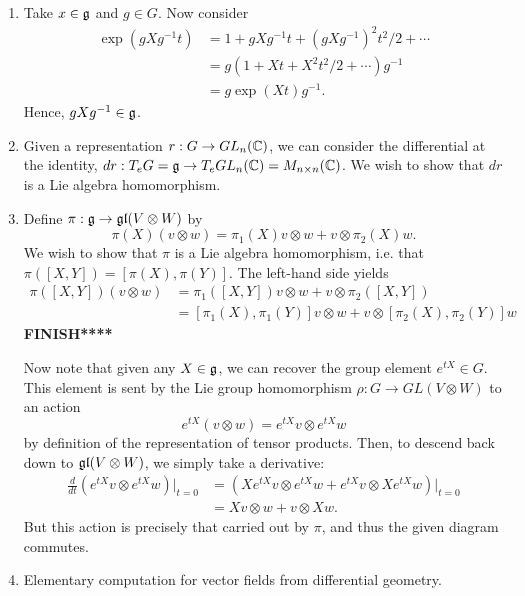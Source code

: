 \documentclass{../mathnotes}
\begin{document}
\begin{enumerate}

    \item Take $x\in\mathfrak g$ and $g\in G$. Now consider
        \begin{align*}
            \exp\left(gXg^{-1}t\right)&=1+gXg^{-1}t+(gXg^{-1})^2t^2/2+\cdots\\
            &=g\left(1+Xt+X^2t^2/2+\cdots\right)g^{-1}\\
            &=g\exp(Xt)g^{-1}.
        \end{align*}
        Hence, $gXg^{-1}\in\mathfrak g$.

    \item Given a representation $r:G\to GL_n(\mathbb{C})$, we can consider the differential at the identity,
        $dr:T_eG=\mathfrak g\to T_eGL_n(\mathbb{C})=M_{n\times n}(\mathbb{C})$. We wish to show that $dr$ is a Lie algebra homomorphism.

    \item Define $\pi:\mathfrak g\to\mathfrak{gl}(V\otimes W)$ by
        \[\pi(X)(v\otimes w)=\pi_1(X)v\otimes w+v\otimes \pi_2(X)w.\]
        We wish to show that $\pi$ is a Lie algebra homomorphism, i.e. that $\pi([X,Y])=[\pi(X),\pi(Y)]$.
        The left-hand side yields
        \begin{align*}
            \pi([X,Y])(v\otimes w)&=\pi_1([X,Y])v\otimes w+v\otimes \pi_2([X,Y])\\
            &=[\pi_1(X),\pi_1(Y)]v\otimes w+v\otimes[\pi_2(X),\pi_2(Y)]w
        \end{align*}
        \textbf{FINISH****}

        Now note that given any $X\in\mathfrak g$, we can recover the group element $e^{tX}\in G$. This element is sent by the Lie
        group homomorphism $\rho:G\to GL(V\otimes W)$ to an action
        \[e^{tX}(v\otimes w)=e^{tX}v\otimes e^{tX}w\]
        by definition of the representation of tensor products. Then, to descend back down to $\mathfrak{gl}(V\otimes W)$, we simply take a derivative:
        \begin{align*}
            \frac{d}{dt}\left(e^{tX}v\otimes e^{tX}w\right)\bigg|_{t=0}&=\left(Xe^{tX}v\otimes e^{tX}w+e^{tX}v\otimes Xe^{tX}w\right)\bigg|_{t=0}\\
            &=Xv\otimes w+v\otimes Xw.
        \end{align*}
        But this action is precisely that carried out by $\pi$, and thus the given diagram commutes.

    \item Elementary computation for vector fields from differential geometry. 

\end{enumerate}
\end{document}
